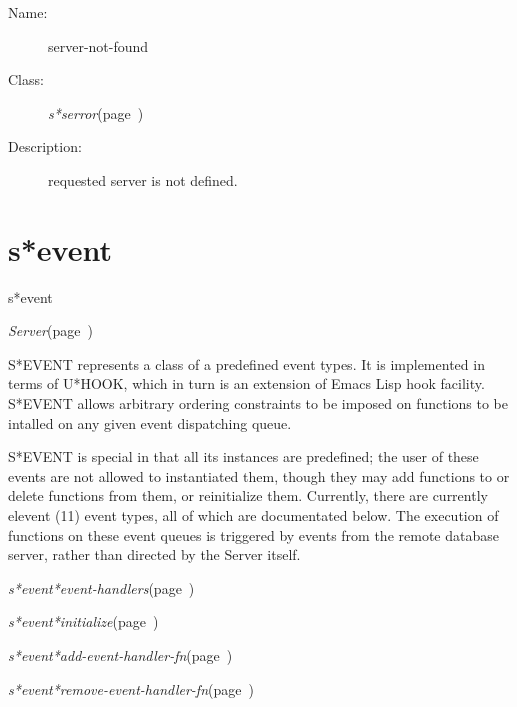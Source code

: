 \begin{description}
\item [Name:]  server-not-found

\item [Class:]
{\sl s*serror}\hfill(page~\pageref{s*serror})

\item [Description:] requested server is not defined.



\end{description}
\horizontalline

\section{s*event}
\label{s*event}

\begin{description}
\item [Name:]  s*event

\item [Layer:]
{\sl Server}\hfill(page~\pageref{Server})

\item [Description:]
S*EVENT represents a class of a predefined event types. It is
implemented in terms of U*HOOK, which in turn is an extension of
Emacs Lisp hook facility. S*EVENT allows arbitrary ordering
constraints to be imposed on functions to be intalled on any
given event dispatching queue.

S*EVENT is special in that all its instances are predefined; the
user of these events are not allowed to instantiated them, though
they may add functions to or delete functions from them, or
reinitialize them.  Currently, there are currently elevent (11)
event types, all of which are documentated below.  The execution
of functions on these event queues is triggered by events from
the remote database server, rather than directed by the Server
itself.

\item [Attributes:]
\item {\sl s*event*event-handlers}\hfill(page~\pageref{s*event*event-handlers})

\item [Operations:]
\item {\sl s*event*initialize}\hfill(page~\pageref{s*event*initialize})
\item {\sl s*event*add-event-handler-fn}\hfill(page~\pageref{s*event*add-event-handler-fn})
\item {\sl s*event*remove-event-handler-fn}\hfill(page~\pageref{s*event*remove-event-handler-fn})


\end{description}
